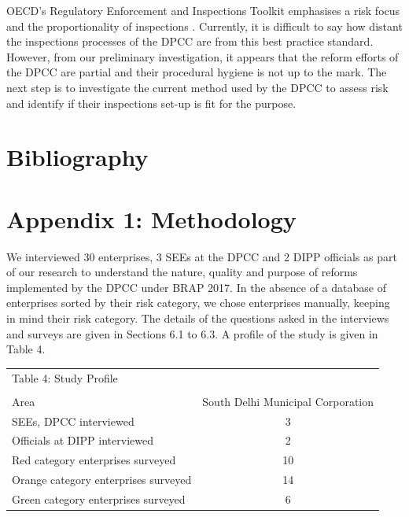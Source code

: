 \documentclass[a4paper, 12pt, twoside]{article}
\begin{document}
	OECD’s Regulatory Enforcement and Inspections Toolkit emphasises a risk focus and the proportionality of inspections \parencite{OECD18}. Currently, it is difficult to say how distant the inspections processes of the DPCC are from this best practice standard. However, from our preliminary investigation, it appears that the reform efforts of the DPCC are partial and their procedural hygiene is not up to the mark. The next step is to investigate the current method used by the DPCC to assess risk and identify if their inspections set-up is fit for the purpose. 
	
\section*{Bibliography}
\printbibliography[heading=none] 	

	\newpage
		\section*{Appendix 1: Methodology}
		
		We interviewed 30 enterprises, 3 SEEs at the DPCC and 2 DIPP officials as part of our research to understand the nature, quality and purpose of reforms implemented by the DPCC under BRAP 2017. In the absence of a database of enterprises sorted by their risk category, we chose enterprises manually, keeping in mind their risk category. The details of the questions asked in the interviews and surveys are given in Sections 6.1 to 6.3. A profile of the study is given in Table 4. \\
	
		
		\begin{tabular}{l c}
		Table 4: Study Profile\\
		\\
		\toprule
		Area & South Delhi Municipal Corporation\\
		SEEs, DPCC interviewed & 3\\
		Officials at DIPP interviewed & 2\\
		Red category enterprises surveyed & 10\\
		Orange category enterprises surveyed & 14\\
		Green category enterprises surveyed & 6\\
		\bottomrule
		\end{tabular}
		
\end{document}
